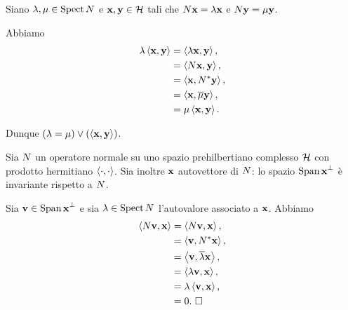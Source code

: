 \Proof Siano $\lambda, \mu \in \operatorname{Spect}{N}$ e
$\Eigenvector, \VarEigenvector \in \PrehilbertSpace$ tali che
$\NormalOperator\Eigenvector = \Eigenvalue\Eigenvector$
e
$\NormalOperator\VarEigenvector = \VarEigenvalue\VarEigenvector$.
\par Abbiamo
\begin{align*}
  \Eigenvalue\HermitianProduct{\Eigenvector}{\VarEigenvector}
  &= \HermitianProduct{\Eigenvalue\Eigenvector}{\VarEigenvector},\\
  &= \HermitianProduct{\NormalOperator\Eigenvector}{\VarEigenvector},\\
  &=\HermitianProduct{\Eigenvector}{\Adjoint{\NormalOperator}\VarEigenvector},\\
 &=\HermitianProduct{\Eigenvector}{\Conjugate{\VarEigenvalue}\VarEigenvector},\\
  &= \VarEigenvalue\HermitianProduct{\Eigenvector}{\VarEigenvector}.
\end{align*}
\par Dunque
$\Or{\Eigenvalue = \VarEigenvalue}
{\HermitianProduct{\Eigenvector}{\VarEigenvector}}$. \EndProof
\begin{Theorem}
  Sia $N$ un operatore normale su uno spazio prehilbertiano
  complesso $\mathcal{H}$ con prodotto hermitiano
  $\left \langle \cdot , \cdot \right \rangle$.
  Sia inoltre $\Eigenvector$ autovettore di $N$:
  lo spazio $\OrthogonalComplement{\LinearSpan{\Eigenvector}}$ \`e 
  invariante rispetto a $N$.
\end{Theorem}
\Proof Sia $\Vector \in \OrthogonalComplement{\LinearSpan{\Eigenvector}}$ e
sia $\lambda \in \operatorname{Spect}{N}$ l'autovalore associato a
$\Eigenvector$.
Abbiamo
\begin{align*}
  \HermitianProduct{\NormalOperator\Vector}{\Eigenvector}
  &= \HermitianProduct{\NormalOperator\Vector}{\Eigenvector},\\
  &= \HermitianProduct{\Vector}{\Adjoint{\NormalOperator}\Eigenvector},\\
  &= \HermitianProduct{\Vector}{\Conjugate{\Eigenvalue}\Eigenvector},\\
  &= \HermitianProduct{\Eigenvalue\Vector}{\Eigenvector},\\
  &= \Eigenvalue\HermitianProduct{\Vector}{\Eigenvector},\\
  &= 0.\text{ \EndProof}
\end{align*}
